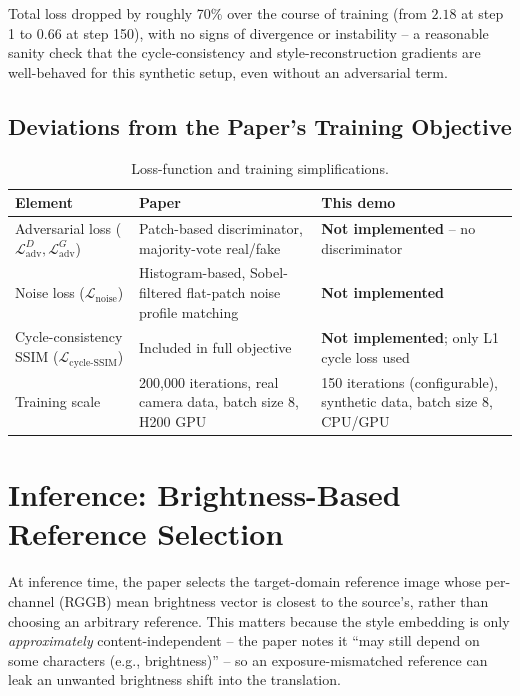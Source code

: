 \documentclass[11pt]{article}
\begin{document}
Total loss dropped by roughly 70\% over the course of training
(from $2.18$ at step 1 to $0.66$ at step 150), with no signs of
divergence or instability -- a reasonable sanity check that the
cycle-consistency and style-reconstruction gradients are well-behaved
for this synthetic setup, even without an adversarial term.

\subsection{Deviations from the Paper's Training Objective}
\label{sec:deviations}
\begin{table}[h]
\centering
\caption{Loss-function and training simplifications.}
\begin{tabular}{p{4.5cm}p{4.5cm}p{4.5cm}}
\hline
\textbf{Element} & \textbf{Paper} & \textbf{This demo} \\
\hline
Adversarial loss ($\mathcal{L}_{\text{adv}}^{D}, \mathcal{L}_{\text{adv}}^{G}$)
    & Patch-based discriminator, majority-vote real/fake
    & \textbf{Not implemented} -- no discriminator \\
Noise loss ($\mathcal{L}_{\text{noise}}$)
    & Histogram-based, Sobel-filtered flat-patch noise
      profile matching
    & \textbf{Not implemented} \\
Cycle-consistency SSIM ($\mathcal{L}_{\text{cycle-SSIM}}$)
    & Included in full objective
    & \textbf{Not implemented}; only L1 cycle loss used \\
Training scale & 200{,}000 iterations, real camera data,
                 batch size 8, H200 GPU
               & 150 iterations (configurable), synthetic
                 data, batch size 8, CPU/GPU \\
\hline
\end{tabular}
\end{table}

\section{Inference: Brightness-Based Reference Selection}

At inference time, the paper selects the target-domain reference image
whose per-channel (RGGB) mean brightness vector is closest to the
source's, rather than choosing an arbitrary reference. This matters
because the style embedding is only \emph{approximately}
content-independent -- the paper notes it ``may still depend on some
characters (e.g., brightness)'' -- so an exposure-mismatched reference
can leak an unwanted brightness shift into the translation.
\end{document}
